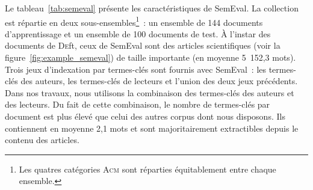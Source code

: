     Le tableau~\ref{tab:semeval} présente les caractéristiques de SemEval. La
    collection est répartie en deux sous-ensembles\footnote{Les quatres
    catégories \textsc{Acm} sont réparties équitablement entre chaque
    ensemble.}~: un ensemble de 144 documents d'apprentissage et un ensemble de
    100 documents de test. À l'instar des documents de \textsc{De}ft, ceux de
    SemEval sont des articles scientifiques (voir la
    figure~\ref{fig:example_semeval}) de taille importante (en moyenne 5~152,3
    mots). Trois jeux d'indexation par termes-clés sont fournis avec SemEval~: les termes-clés
    des auteurs, les termes-clés de lecteurs et l'union des deux jeux
    précédents. Dans nos travaux, nous utilisons la combinaison des termes-clés
    des auteurs et des lecteurs. Du fait de cette combinaison, le nombre de
    termes-clés par document est plus élevé que celui des autres corpus dont
    nous disposons. Ils contiennent en moyenne 2,1 mots et sont majoritairement
    extractibles depuis le contenu des articles.

    \begin{table}[!h]
      \centering

      \caption{Corpus SemEval
               \label{tab:semeval}}
    \end{table}

